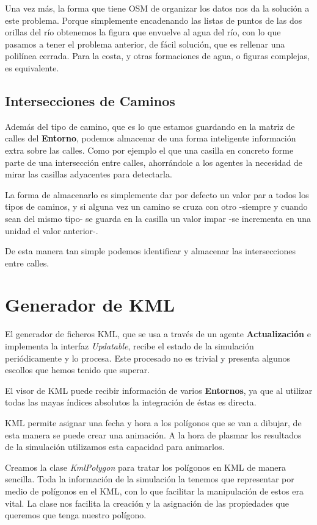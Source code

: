 Una vez más, la forma que tiene OSM de organizar los datos nos da la solución
a este problema. Porque simplemente encadenando las listas de puntos de las dos
orillas del río obtenemos la figura que envuelve al agua del río, con lo que
pasamos a tener el problema anterior, de fácil solución, que es rellenar una
polilínea cerrada. Para la costa, y otras formaciones de agua, o figuras
complejas, es equivalente.

\subsection*{Intersecciones de Caminos}

Además del tipo de camino, que es lo que estamos guardando en la matriz de
calles del {\bf Entorno}, podemos almacenar de una forma inteligente información
extra sobre las calles. Como por ejemplo el que una casilla en concreto forme
parte de una intersección entre calles, ahorrándole a los agentes la necesidad
de mirar las casillas adyacentes para detectarla.

La forma de almacenarlo es simplemente dar por defecto un valor par a todos los
tipos de caminos, y si alguna vez un camino se cruza con otro -siempre y cuando
sean del mismo tipo- se guarda en la casilla un valor impar -se incrementa en
una unidad el valor anterior-.

De esta manera tan simple podemos identificar y almacenar las intersecciones
entre calles.

\section*{Generador de KML}

El generador de ficheros KML, que se usa a través de un agente {\bf
Actualización} e implementa la interfaz {\em Updatable}, recibe el estado de la
simulación periódicamente y lo procesa. Este procesado no es trivial y presenta
algunos escollos que hemos tenido que superar.

El visor de KML puede recibir información de varios {\bf Entornos}, ya que al
utilizar todas las mayas índices absolutos la integración de éstas es directa.

KML permite asignar una fecha y hora a los polígonos que se van a dibujar, de
esta manera se puede crear una animación. A la hora de plasmar los resultados
de la simulación utilizamos esta capacidad para animarlos.

Creamos la clase {\em KmlPolygon} para tratar los polígonos en KML de manera
sencilla. Toda la información de la simulación la tenemos que representar por
medio de polígonos en el KML, con lo que facilitar la manipulación de estos era
vital. La clase nos facilita la creación y la asignación de las propiedades que
queremos que tenga nuestro polígono.

